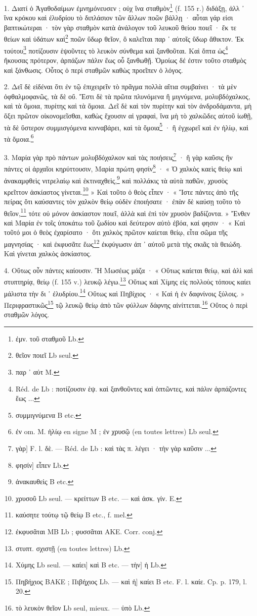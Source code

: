 \documentclass[a4paper, 11pt, oneside, polutonikogreek, french]{article}
\begin{document}
\bigskip

1. Διατί ὁ Ἀγαθοδαίμων ἐμνημόνευσεν ; οὐχ ἵνα σταθμὸν\footnote{ἐμν. τοῦ σταθμοῦ Lb.} (f. 155 r.) διδάξῃ, ἀλλ ᾽ ἵνα κρόκου καὶ ἐλυδρίου τὸ διπλάσιον τῶν ἄλλων ποῶν βάλλῃ · αὗται γάρ εἰσι βαπτικώτεραι · τὸν γὰρ σταθμὸν κατὰ ἀνάλογον τοῦ λευκοῦ θείου ποιεῖ · ἔκ τε θείων καὶ ὑδάτων καὶ\footnote{θεῖον ποιεῖ Lb seul.} ποῶν ὕδωρ θεῖον, ὃ καλεῖται παρ ᾽ αὐτοῖς ὕδωρ ἄθικτον. Ἐκ τούτου\footnote{παρ ᾽ αὐτ M.} ποτίζουσιν ἑψοῦντες τὸ λευκὸν σύνθεμα καὶ ξανθοῦται. Καὶ ὄπτα ὡς\footnote{Réd. de Lb : ποτίζουσιν ἑψ. καὶ ξανθοῦντες καὶ ὀπτῶντες, καὶ πάλιν ἁρπάζοντες ἕως ...} ἤκουσας πρότερον, ἁρπάζων πάλιν ἕως οὗ ξανθωθῇ. Ὁμοίως δέ ἐστιν τοῦτο σταθμὸς καὶ ξάνθωσις. Οὗτος ὁ περὶ σταθμῶν καθὼς προεῖπεν ὁ λόγος.

2. Δεῖ δὲ εἰδέναι ὅτι ἐν τῷ ἐπιχειρεῖν τὸ πρᾶγμα πολλὰ αἴτια συμβαίνει · τὰ μὲν ὀφθαλμοφανῶς, τὰ δὲ οὔ. Ἔστι δὲ τὰ πρῶτα πλυνόμενα ἢ μιγνύμενα, μολυβδόχαλκος, καὶ τὰ ὅμοια, πυρίτης καὶ τὰ ὅμοια. Δεῖ δὲ καὶ τὸν πυρίτην καὶ τὸν ἀνδροδάμαντα, μὴ ὄξει πρῶτον οἰκονομεῖσθαι, καθὼς ἔχουσιν αἱ γραφαὶ, ἵνα μὴ τὸ χαλκῶδες αὐτοῦ ἰωθῇ, τὰ δὲ ὕστερον συμμισγόμενα κινναβάρει, καὶ τὰ ὅμοια\footnote{συμμιγνύμενα B etc.} · ἢ ἐγχωρεῖ καὶ ἐν ἡλίῳ, καὶ τὰ ὅμοια.\footnote{ἐν om. M. ἡλίῳ en signe M ; ἐν χρυσῷ (en toutes lettres) Lb seul.}

3. Μαρία γὰρ πρὸ πάντων μολυβδόχαλκον καὶ τὰς ποιήσεις\footnote{γὰρ] F. l. δὲ. --- Réd. de Lb : καὶ τὰς π. λέγει · τὴν γὰρ καῦσιν ...} · ἢ γὰρ καῦσις ἣν πάντες οἱ ἀρχαῖοι κηρύττουσιν, Μαρία πρώτη φησίν\footnote{φησίν] εἶπεν Lb.} · « Ὁ χαλκὸς καεὶς θείῳ καὶ ἀνακαμφθεὶς νιτρελαίῳ καὶ ἐκτιναχθεὶς,\footnote{ἀνακαυθεὶς B etc.} καὶ πολλάκις τὰ αὐτὰ παθῶν, χρυσὸς κρεῖττον ἀσκίαστος γίνεται.\footnote{χρυσοῦ Lb seul. --- κρείττων B etc. --- καὶ ἀσκ. γίν. E.} » Καὶ τοῦτο ὁ θεὸς εἶπεν · « Ἴστε πάντες ἀπὸ τῆς πείρας ὅτι καύσαντες τὸν χαλκὸν θείῳ οὐδὲν ἐποιήσατε · ἐπὰν δὲ καύσῃ τοῦτο τὸ θεῖον,\footnote{καύσητε τούτῳ τῷ θείῳ B etc., f. mel.} τότε οὐ μόνον ἀσκίαστον ποιεῖ, ἀλλὰ καὶ ἐπὶ τὸν χρυσὸν βαδίζοντα. » Ἔνθεν καὶ Μαρία ἐν τοῖς ὑποκάτω τοῦ ζωδίου καὶ δεύτερον αὐτὸ ἐβόα, καί φησιν · « Καὶ τοῦτό μοι ὁ θεὸς ἐχαρίσατο · ὅτι χαλκὸς πρῶτον καίεται θείῳ, εἶτα σῶμα τῆς μαγνησίας · καὶ ἐκφυσᾶτε ἕως\footnote{ἐκφυσᾶται MB Lb ; φυσσᾶται AKE. Corr. conj.} ἐκφύγωσιν ἀπ ᾽ αὐτοῦ μετὰ τὴς σκιᾶς τὰ θειώδη. Καὶ γίνεται χαλκὸς ἀσκίαστος.

4. Οὕτως οὖν πάντες καίουσιν. Ἥ Μωσέως μάζα · « Οὕτως καίεται θείῳ, καὶ ἀλὶ καὶ στυπτηρίᾳ, θείῳ (f. 155 v.) λευκῷ λέγω.\footnote{στυπτ. σχιστῇ (en toutes lettres) Lb.} Οὕτως καὶ Χίμης εἰς πολλοὺς τόπους καίει μάλιστα τὴν δι ᾽ ἐλυδρίου.\footnote{Χύμης Lb seul. --- καίει] καὶ B etc. --- τὴν] ἡ Lb.} Οὕτως καὶ Πηβίχιος · « Καὶ ἡ ἐν δαφνίνοις ξύλοις. » Περιφραστικῶς\footnote{Πηβήχιος BAKE ; Πιβήχιος Lb. --- καὶ ἡ] καίει B etc. F. l. καίε. Cp. p. 179, l. 20.} τῷ λευκῷ θείῳ ἀπὸ τῶν φύλλων δάφνης αἰνίττεται.\footnote{τὸ λευκὸν θεῖον Lb seul, mieux. --- ὑπὸ Lb.} Οὕτος ὁ περὶ σταθμῶν λόγος.
\end{document}
